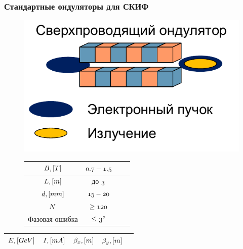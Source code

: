 \documentclass[14pt, hyperref = {colorlinks}]{beamer}
\begin{document}
\small
\begin{frame}
\frametitle{Стандартные ондуляторы для СКИФ}\label{t1}
\vspace{-10pt}
\begin{figure}[h]
	\begin{minipage}[h]{0.49\linewidth}
		\raggedright{\includegraphics[width=0.99\linewidth]{pic/sim_und.pdf}}
	\end{minipage}
	\begin{minipage}[h]{0.49\linewidth}
	\vspace{10pt}
	\begin{table}[h]
		\begin{tabular}{|c|c|c|c|}
			\hline\hline
			\rule{0pt}{3ex}$\mathnormal{B, [T]}$      & $\mathnormal{0.7 - 1.5}$   \\ \hline
			\rule{0pt}{3ex}$\mathnormal{L, [m]}$ & до $\mathnormal{3}$        \\ \hline
			\rule{0pt}{3ex}$\mathnormal{d, [mm]}$     & $\mathnormal{15 - 20}$     \\ \hline
			\rule{0pt}{3ex}$\mathnormal{N}$         & $\mathnormal{\geq 120}$ \\ \hline
			\rule{0pt}{3ex}Фазовая ошибка &$\mathnormal{\leq 3^{\circ}}$  \\
			\hline
		\end{tabular}
	\end{table}
	\end{minipage}
\end{figure}
\vspace{-20pt}
\begin{table}[h]
	\begin{tabular}{|c|c|c|c|c|}
		\hline
		\hline
		\rule{0pt}{3ex}   $\mathnormal{E, [GeV]}$ & $\mathnormal{I, [mA]}$ & $\mathnormal{\beta_x, [m]}$ & $\mathnormal{\beta_{y}, [m]}$&\\ \hline

\end{tabular}
\end{table}
\end{frame}
\end{document}

